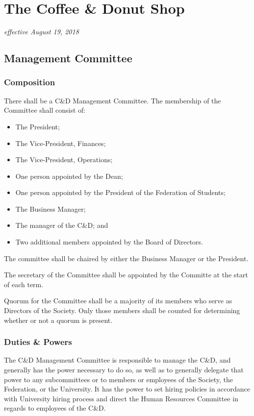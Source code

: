 \section{The Coffee \& Donut Shop}
\emph{effective August 19, 2018}\\

\subsection{Management Committee}
\subsubsection{Composition}
There shall be a C\&D Management Committee. The membership of the Committee shall
consist of:
\begin{itemize}
    \item The President;
    \item The Vice-President, Finances;
    \item The Vice-President, Operations;
    \item One person appointed by the Dean;
    \item One person appointed by the President of
        the Federation of Students; 
    \item The Business Manager;
    \item The manager of the C\&D; and
    \item Two additional members appointed by the Board of Directors.
\end{itemize}

The committee shall be chaired by either the Business Manager or the President.

The secretary of the Committee shall be appointed by the Committe at the start
of each term.

Quorum for the Committee shall be a majority of its members who serve as
Directors of the Society. Only those members shall be counted for determining
whether or not a quorum is present.

\subsubsection{Duties \& Powers}
The C\&D Management Committee is responsible to manage the C\&D, and generally
has the power necessary to do so, as well as to generally delegate that power
to any subcommittees or to members or employees of the Society, the Federation,
or the University. It has the power to set hiring policies in accordance with
University hiring process and direct the Human Resources Committee in regards
to employees of the C\&D.

